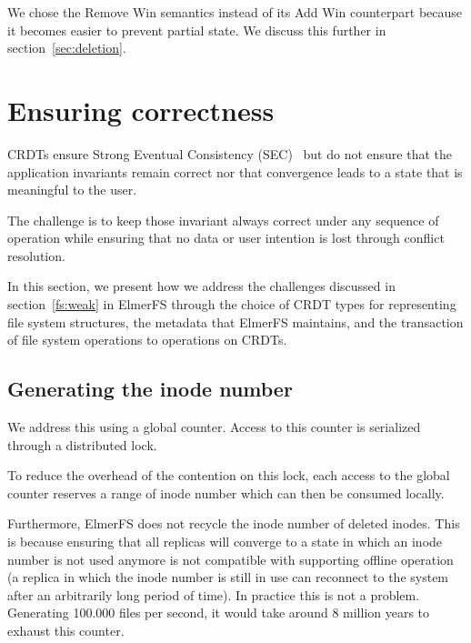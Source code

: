 \documentclass[sigconf,anonymous,10pt]{acmart}
\begin{document}
We chose the Remove Win semantics instead of its Add Win counterpart because
it becomes easier to prevent partial state. We discuss this further
in section~\ref{sec:deletion}.

\section{Ensuring correctness}

CRDTs ensure Strong Eventual Consistency (SEC)~\cite{shapiro2011conflict} but
do not ensure that the application invariants remain correct
nor that convergence leads to a state that is meaningful
to the user.

The challenge is to keep those invariant always correct under any sequence
of operation while ensuring that no data or user intention is lost through
conflict resolution.

In this section,
we present how we address the challenges discussed in section~\ref{fs:weak}
in ElmerFS through the choice of CRDT types for representing file system structures,
the metadata that ElmerFS maintains, and the transaction of file system operations
to operations on CRDTs.


\subsection{Generating the inode number}
\label{sec:generation_inode_number}
We address this using a global counter. Access to this counter
is serialized through a distributed lock.

To reduce the overhead of the contention on this lock,
each access to the global counter reserves a range of inode number which
can then be consumed locally.

Furthermore, ElmerFS does not recycle the inode number of deleted inodes.
This is because ensuring that all replicas will converge to a state in which
an inode number is not used anymore is not compatible with supporting offline
operation (a replica in which the inode number is still in use can reconnect
to the system after an arbitrarily long period of time).
In practice this is not a problem.
Generating 100.000 files per second, it would take around
8 million years to exhaust this counter.
\end{document}
